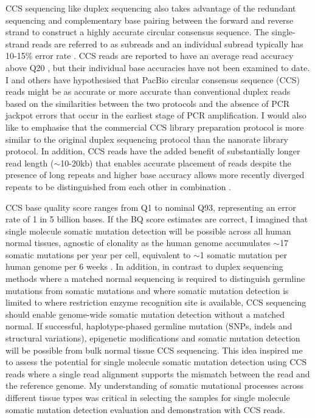 CCS sequencing like duplex sequencing also takes advantage of the redundant sequencing and complementary base pairing between the forward and reverse strand to construct a highly accurate circular consensus sequence. The single-strand reads are referred to as subreads and an individual subread typically has 10-15\% error rate \cite{Chaisson2012-vr}. CCS reads are reported to have an average read accuracy above Q20 \cite{Wenger2019-pw}, but their individual base accuracies have not been examined to date. I and others have hypothesised that PacBio circular consensus sequence (CCS) reads might be as accurate or more accurate than conventional duplex reads based on the similarities between the two protocols \cite{} and the absence of PCR jackpot errors that occur in the earliest stage of PCR amplification. I would also like to emphasise that the commercial CCS library preparation protocol is more similar to the original duplex sequencing protocol than the nanorate library protocol. In addition, CCS reads have the added benefit of substantially longer read length ($\sim$10-20kb) that enables accurate placement of reads despite the presence of long repeats and higher base accuracy allows more recently diverged repeats to be distinguished from each other in combination \cite{}.

CCS base quality score ranges from Q1 to nominal Q93, representing an error rate of 1 in 5 billion bases. If the BQ score estimates are correct, I imagined that single molecule somatic mutation detection will be possible across all human normal tissues, agnostic of clonality as the human genome accumulates $\sim$17 somatic mutations per year per cell, equivalent to $\sim$1 somatic mutation per human genome per 6 weeks \cite{Mitchell2022-ry}. In addition, in contrast to duplex sequencing methods where a matched normal sequencing is required to distinguish germline mutations from somatic mutations and where somatic mutation detection is limited to where restriction enzyme recognition site is available, CCS sequencing should enable genome-wide somatic mutation detection without a matched normal. If successful, haplotype-phased germline mutation (SNPs, indels and structural variations), epigenetic modifications and somatic mutation detection will be possible from bulk normal tissue CCS sequencing. This idea inspired me to assess the potential for single molecule somatic mutation detection using CCS reads where a single read alignment supports the mismatch between the read and the reference genome. My understanding of somatic mutational processes across different tissue types was critical in selecting the samples for single molecule somatic mutation detection evaluation and demonstration with CCS reads. 

